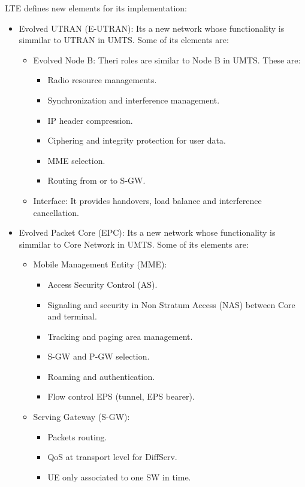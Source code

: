 \documentclass[../main.tex]{subfiles}
\begin{document}
LTE defines new elements for its implementation:
\begin{itemize}
	\item {
		Evolved UTRAN (E-UTRAN): Its a new network whose functionality is simmilar to UTRAN in UMTS. Some of its elements are:
		\begin{itemize}
			\item {
				Evolved Node B: Theri roles are similar to Node B in UMTS. These are:
				\begin{itemize}
					\item Radio resource managements.
					\item Synchronization and interference management.
					\item IP header compression.
					\item Ciphering and integrity protection for user data.
					\item MME selection.
					\item Routing from or to S-GW.
				\end{itemize}
			}
			\item Interface: It provides handovers, load balance and interference cancellation.
		\end{itemize}
	}
	\item {
		Evolved Packet Core (EPC): Its a new network whose functionality is simmilar to Core Network in UMTS. Some of its elements are:
		\begin{itemize}
			\item {
				Mobile Management Entity (MME):
				\begin{itemize}
					\item Access Security Control (AS).
					\item Signaling and security in Non Stratum Access (NAS) between Core and terminal.
					\item Tracking and paging area management.
					\item S-GW and P-GW selection.
					\item Roaming and authentication.
					\item Flow control EPS (tunnel, EPS bearer).
				\end{itemize}
			}
			\item {
				Serving Gateway (S-GW):
				\begin{itemize}
					\item Packets routing.
					\item QoS at transport level for DiffServ.
					\item UE only associated to one SW in time.

\end{itemize}}
\end{itemize}}
\end{itemize}
\end{document}
